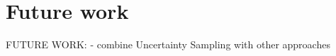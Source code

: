 \section{Future work} 
\label{sec:futurework}



FUTURE WORK:
- combine Uncertainty Sampling with other approaches
